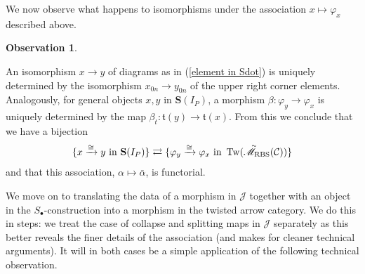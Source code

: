 \documentclass[12pt, reqno]{amsart}
\theoremstyle{plain}
\theoremstyle{definition}
\newtheorem{observation}[theorem]{Observation}
\renewcommand{\phi}{\varphi}
\begin{document}
We now observe what happens to isomorphisms under the association $x\mapsto \phi_x$ described above.

\begin{observation}\label{isomorphisms to isomorphisms}

An isomorphism $x\rightarrow y$ of diagrams as in (\ref{element in Sdot}) is uniquely determined by the isomorphism $x_{0n}\rightarrow y_{0n}$ of the upper right corner elements. Analogously, for general objects $x,y$ in $\mathbf{S}(I_P)$, a morphism $\beta\colon \phi_y\rightarrow \phi_x$ is uniquely determined by the map $\beta_t\colon \mathfrak{t}(y)\rightarrow \mathfrak{t}(x)$. From this we conclude that we have a bijection
\begin{equation*}
\{x\xrightarrow{\cong}y \text{ in } \mathbf{S}(I_P)\} \rightleftarrows \{\phi_y\xrightarrow{\cong} \phi_x \text{ in } \operatorname{Tw}(\accentset{\sim}{\mathscr{M}}_{\operatorname{RBS}}(\mathcal{C}))\}
\end{equation*}
and that this association, $\alpha\mapsto \bar{\alpha}$, is functorial.
\end{observation}

We move on to translating the data of a morphism in $\mathcal{J}$ together with an object in the $S_\bullet$-construction into a morphism in the twisted arrow category. We do this in steps: we treat the case of collapse and splitting maps in $\mathcal{J}$ separately as this better reveals the finer details of the association (and makes for cleaner technical arguments). It will in both cases be a simple application of the following technical observation.
\end{document}
